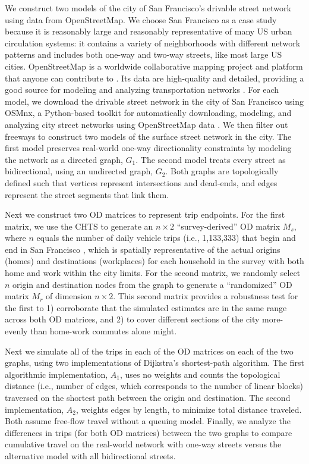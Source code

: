 \documentclass{trbunofficial}
\begin{document}
We construct two models of the city of San Francisco's drivable street network using data from OpenStreetMap. We choose San Francisco as a case study because it is reasonably large and reasonably representative of many US urban circulation systems: it contains a variety of neighborhoods with different network patterns and includes both one-way and two-way streets, like most large US cities. OpenStreetMap is a worldwide collaborative mapping project and platform that anyone can contribute to \cite{jokar_arsanjani_openstreetmap_2015}. Its data are high-quality and detailed, providing a good source for modeling and analyzing transportation networks \cite{barron_comprehensive_2014,zielstra_assessing_2013,barrington-leigh_worlds_2017,zhao_agent-based_2019}. For each model, we download the drivable street network in the city of San Francisco using OSMnx, a Python-based toolkit for automatically downloading, modeling, and analyzing city street networks using OpenStreetMap data \cite{boeing_osmnx:_2017,boeing_multi-scale_2018,boeing_street_2019}. We then filter out freeways to construct two models of the surface street network in the city. The first model preserves real-world one-way directionality constraints by modeling the network as a directed graph, $G_1$. The second model treats every street as bidirectional, using an undirected graph, $G_2$. Both graphs are topologically defined such that vertices represent intersections and dead-ends, and edges represent the street segments that link them.

Next we construct two OD matrices to represent trip endpoints. For the first matrix, we use the CHTS to generate an $n \times 2$ \enquote{survey-derived} OD matrix $M_s$, where $n$ equals the number of daily vehicle trips (i.e., 1,133,333) that begin and end in San Francisco \cite{san_francisco_county_transportation_authority_tncs_2017}, which is spatially representative of the actual origins (homes) and destinations (workplaces) for each household in the survey with both home and work within the city limits. For the second matrix, we randomly select $n$ origin and destination nodes from the graph to generate a \enquote{randomized} OD matrix $M_r$ of dimension $n \times 2$. This second matrix provides a robustness test for the first to 1) corroborate that the simulated estimates are in the same range across both OD matrices, and 2) to cover different sections of the city more-evenly than home-work commutes alone might.

Next we simulate all of the trips in each of the OD matrices on each of the two graphs, using two implementations of Dijkstra's shortest-path algorithm. The first algorithmic implementation, $A_1$, uses no weights and counts the topological distance (i.e., number of edges, which corresponds to the number of linear blocks) traversed on the shortest path between the origin and destination. The second implementation, $A_2$, weights edges by length, to minimize total distance traveled. Both assume free-flow travel without a queuing model. Finally, we analyze the differences in trips (for both OD matrices) between the two graphs to compare cumulative travel on the real-world network with one-way streets versus the alternative model with all bidirectional streets.
\end{document}
